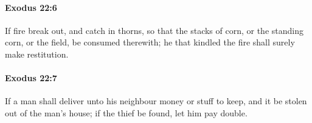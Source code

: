 		\paragraph{Exodus 22:6} %
			\label{EXODUS-22-6}

			If fire break out, and catch in thorns, so that the stacks of corn, or the standing corn, or the field, be consumed therewith; he that kindled the fire shall surely make restitution.


		\paragraph{Exodus 22:7} %
			\label{EXODUS-22-7}

			If a man shall deliver unto his neighbour money or stuff to keep, and it be stolen out of the man's house; if the thief be found, let him pay double.


